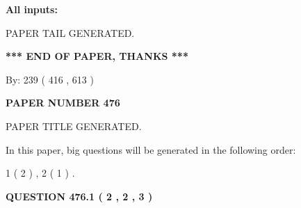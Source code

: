 \documentclass[12pt]{article}
\begin{document}
   
   
   
\noindent{}
   
   
   
   
\noindent\vspace{0.1in}\hspace{-0.08in} {\textbf{\Large{All inputs: }}}
   
   
   
   
   
   
 \vspace{0.2in}
 
   
   
\vspace{2.0in} PAPER TAIL GENERATED.
   
   
   
   
\vspace{1.0in} 
{\textbf{\large{ *** END OF PAPER, THANKS *** }}} 
   
   
\hspace{1.0in} By: 
 239 ( 416 ,  613 )
   
   
   
   
\newpage 
\setcounter{page}{ 
   476001 } 
   
   
   
   
 {\textbf{ \Large{ PAPER NUMBER  476  }}}
   
   
\vspace{0.2in}
   
   
   
   
   
   
   
   
 \vspace{0.2in}
 
 
 
 
   
   
 PAPER TITLE GENERATED.
   
   
   
\vspace{0.2in}
   
In this paper, big questions will be generated in the following order: 
   
   
   1 ( 2 )
 ,
   2 ( 1 )
 .
  
\vspace{0.2in}
  
{\textbf{\Large{QUESTION
476.1 
 ( 2 , 2 , 3 )
}}}
  
\end{document}
